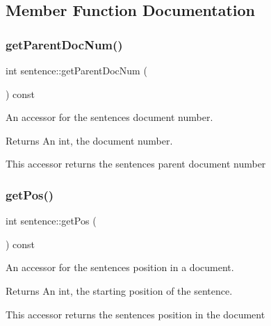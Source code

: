 \subsection{Member Function Documentation}
\mbox{\label{classsentence_a6b8b9942e1a30a75ca2308d6b71fb24d}} 
\subsubsection{\texorpdfstring{get\+Parent\+Doc\+Num()}{getParentDocNum()}}
{\footnotesize\ttfamily int sentence\+::get\+Parent\+Doc\+Num (\begin{DoxyParamCaption}{ }\end{DoxyParamCaption}) const}



An accessor for the sentence\textquotesingle{}s document number. 

\begin{DoxyReturn}{Returns}
An int, the document number.
\end{DoxyReturn}
This accessor returns the sentence\textquotesingle{}s parent document number \mbox{\label{classsentence_ad4786351fceabfd06ca10b7766d516b3}} 
\subsubsection{\texorpdfstring{get\+Pos()}{getPos()}}
{\footnotesize\ttfamily int sentence\+::get\+Pos (\begin{DoxyParamCaption}{ }\end{DoxyParamCaption}) const}



An accessor for the sentence\textquotesingle{}s position in a document. 

\begin{DoxyReturn}{Returns}
An int, the starting position of the sentence.
\end{DoxyReturn}
This accessor returns the sentence\textquotesingle{}s position in the document \mbox{\label{classsentence_ae4cbc4603c414be42f68131e243e1bed}} 
